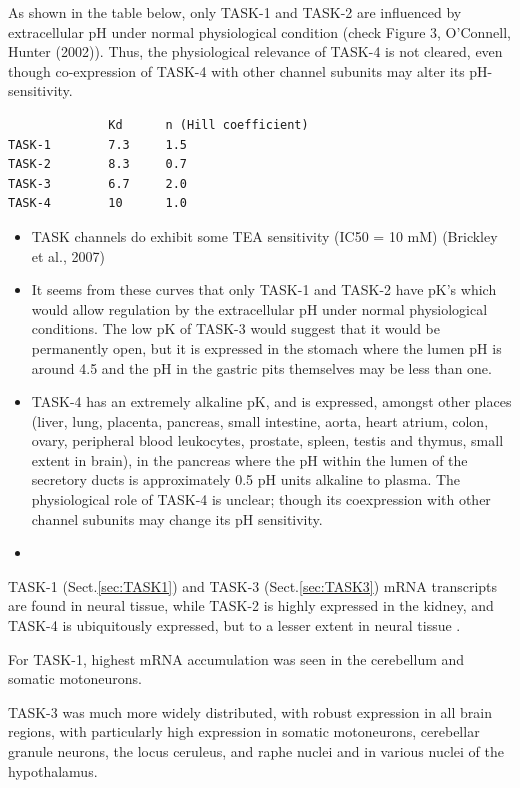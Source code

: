 As shown in the table below, only TASK-1 and TASK-2 are influenced by
extracellular pH under normal physiological condition (check Figure 3,
O'Connell, Hunter (2002)). Thus, the physiological relevance of TASK-4 is not
cleared, even though co-expression of TASK-4 with other channel subunits may
alter its pH-sensitivity.

\begin{verbatim}
              Kd      n (Hill coefficient)
TASK-1        7.3     1.5
TASK-2        8.3     0.7
TASK-3        6.7     2.0
TASK-4        10      1.0
\end{verbatim}


\begin{itemize}
  \item TASK channels do exhibit some TEA sensitivity (IC50 = 10 mM) (Brickley
  et al., 2007)
  
  \item  It seems from these curves that only TASK-1 and TASK-2 have pK's which would
allow regulation by the extracellular pH under normal physiological conditions.
The low pK of TASK-3 would suggest that it would be permanently open, but it is
expressed in the stomach where the lumen pH is around 4.5 and the pH in the
gastric pits themselves may be less than one.

  \item TASK-4 has an extremely alkaline pK, and is expressed, amongst other places
(liver, lung, placenta, pancreas, small intestine, aorta, heart atrium, colon,
ovary, peripheral blood leukocytes, prostate, spleen, testis and thymus, small
extent in brain), in the pancreas where the pH within the lumen of the secretory
ducts is approximately 0.5 pH units alkaline to plasma. The physiological role
of TASK-4 is unclear; though its coexpression with other channel subunits may
change its pH sensitivity.
  
  \item 
\end{itemize}

TASK-1 (Sect.\ref{sec:TASK1}) and TASK-3 (Sect.\ref{sec:TASK3}) mRNA transcripts
are found in neural tissue, while TASK-2 is highly expressed in the kidney, and
TASK-4 is ubiquitously expressed, but to a lesser extent in neural tissue
\citep{OConnell2002}.

For  TASK-1,  highest  mRNA accumulation  was  seen  in  the  cerebellum  and 
somatic  motoneurons. 

TASK-3  was  much  more  widely  distributed,  with robust  expression  in  all 
brain  regions,  with  particularly  high expression  in  somatic  motoneurons, 
cerebellar  granule  neurons, the locus ceruleus, and raphe nuclei and in
various nuclei of the hypothalamus.


